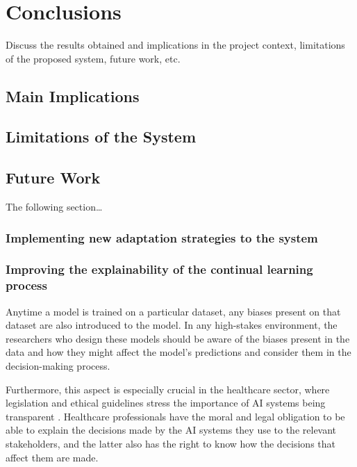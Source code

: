 \documentclass[../main.tex]{subfiles}
\begin{document}
\chapter{Conclusions} \label{chap:conclusions} 
    

    Discuss the results obtained and implications in the project context, limitations of the proposed system, future work, etc.
    

    \section{Main Implications} \label{conclusions:implications} 

    \section{Limitations of the System} \label{conclusions:limitations} 
    
    \section{Future Work} \label{conclusions:future_work} 

    The following section\dots

    \subsection{
        Implementing new adaptation strategies to the system 
    } \label{conclusions:future_work:adaptation_strategies}


    \subsection{
        Improving the explainability of the continual learning process 
    } \label{conclusions:future_work:explainability}

    Anytime a model is trained on a particular dataset, any biases present on that dataset are also introduced to the model. In any high-stakes environment, the researchers who design these models should be aware of the biases present in the data and how they might affect the model's predictions and consider them in the decision-making process.

    Furthermore, this aspect is especially crucial in the healthcare sector, where legislation and ethical guidelines stress the importance of AI systems being transparent \cite{noauthor_ethics_2019,eu_aiact_2023}. Healthcare professionals have the moral and legal obligation to be able to explain the decisions made by the AI systems they use to the relevant stakeholders, and the latter also has the right to know how the decisions that affect them are made.
    
\end{document}
